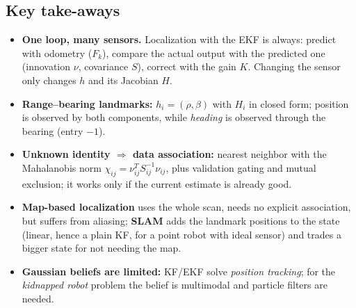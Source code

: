 \documentclass[11pt,a4paper]{article}
\def\bm#1{#1}%
\theoremstyle{definition}
\theoremstyle{plain}
\theoremstyle{remark}
\begin{document}
\subsection{Key take-aways}
\begin{itemize}
  \item \textbf{One loop, many sensors.} Localization with the EKF is always: predict with odometry ($\bm F_k$), compare the actual output with the predicted one (innovation $\bm\nu$, covariance $\bm S$), correct with the gain $\bm K$. Changing the sensor only changes $\bm h$ and its Jacobian $\bm H$.
  \item \textbf{Range--bearing landmarks:} $\bm h_i=(\rho,\beta)$ with $\bm H_i$ in closed form; position is observed by both components, while \emph{heading} is observed through the bearing (entry $-1$).
  \item \textbf{Unknown identity $\Rightarrow$ data association:} nearest neighbor with the Mahalanobis norm $\chi_{ij}=\bm\nu_{ij}^T\bm S_{ij}^{-1}\bm\nu_{ij}$, plus validation gating and mutual exclusion; it works only if the current estimate is already good.
  \item \textbf{Map-based localization} uses the whole scan, needs no explicit association, but suffers from aliasing; \textbf{SLAM} adds the landmark positions to the state (linear, hence a plain KF, for a point robot with ideal sensor) and trades a bigger state for not needing the map.
  \item \textbf{Gaussian beliefs are limited:} KF/EKF solve \emph{position tracking}; for the \emph{kidnapped robot} problem the belief is multimodal and particle filters are needed.
\end{itemize}
\end{document}

